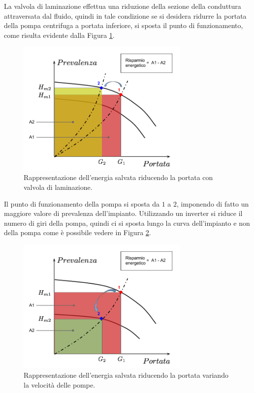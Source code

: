 \documentclass[laurea,oneside,11pt]{USiena_tesiLM3}
\begin{document}
La valvola di laminazione effettua una riduzione della sezione della conduttura attraversata dal fluido, quindi in tale condizione se si desidera ridurre la portata della pompa centrifuga a portata inferiore, si sposta il punto di funzionamento, come risulta evidente dalla Figura \ref{fig:strozzatura}.

\begin{figure}[!ht]
\centering
\includegraphics[width=0.75\textwidth]{figure/strozzatura} 
\caption{Rappresentazione dell'energia salvata riducendo la portata con valvola di laminazione.}
\label{fig:strozzatura}
\end{figure}

Il punto di funzionamento della pompa si sposta da $1$ a $2$, imponendo di fatto un maggiore valore di prevalenza dell'impianto. Utilizzando un inverter si riduce il numero di giri della pompa, quindi ci si sposta lungo la curva dell'impianto e non della pompa come è possibile vedere in Figura \ref{fig:var_velocita}. 

\begin{figure}[!ht]
\centering
\includegraphics[width=0.75\textwidth]{figure/var_velocita} 
\caption{Rappresentazione dell'energia salvata riducendo la portata variando la velocità delle pompe.}
\label{fig:var_velocita}
\end{figure}
\end{document}

